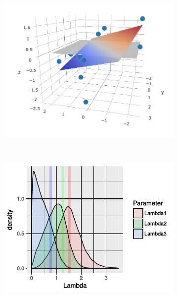 \documentclass{article}
\begin{document}
\begin{figure}
    \centering
    \begin{subfigure}[b]{0.3\textwidth}
        \includegraphics[width=\textwidth]{uncertainty.pdf}
        \caption{}
        \label{fig:MleSubspaceEstimate}
    \end{subfigure}
    ~ %
    \begin{subfigure}[b]{0.3\textwidth}
        \includegraphics[width=\textwidth]{syntheticLambdaPosterior.pdf}
        \caption{}
        \label{fig:SyntheticPosteriorEstimates}
    \end{subfigure}

\end{figure}
\end{document}
